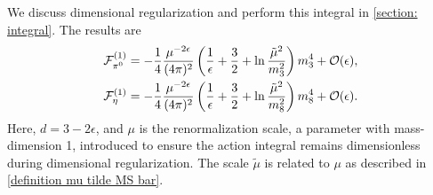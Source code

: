 We discuss dimensional regularization and perform this integral in \autoref{section: integral}.
The results are
%
\begin{align}
    \label{Free energy pi 0}
    \mathcal{F}^{(1)}_{\pi^0} 
    &= 
    -  \frac{1}{4} \frac{ \mu^{-2 \epsilon}}{(4\pi)^2}
    \left( \frac{1}{\epsilon} + \frac{3}{2} + \ln \frac{\tilde \mu^2}{m_3^2} \right)
    m_3^4
    + \mathcal{O}(\epsilon), \\
    \mathcal{F}^{(1)}_{\eta}
    &= 
    - \frac{1}{4} \frac{\mu^{-2 \epsilon}}{(4\pi)^2} 
    \left( \frac{1}{\epsilon} + \frac{3}{2} + \ln \frac{\tilde \mu^2}{m_8^2} \right)
    m_8^4
    + \mathcal{O}(\epsilon).
\end{align}
%
Here, $d = 3 - 2\epsilon$, and $\mu$ is the renormalization scale, a parameter with mass-dimension 1, introduced to ensure the action integral remains dimensionless during dimensional regularization. The scale $\tilde \mu$ is related to $\mu$ as described in \autoref{definition mu tilde MS bar}.

